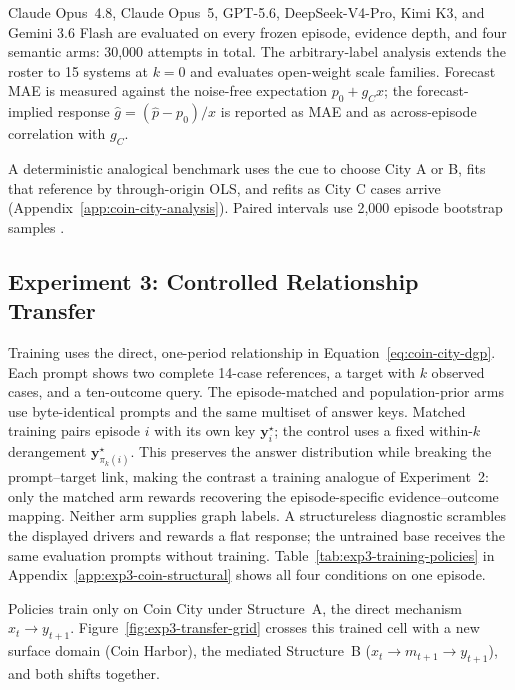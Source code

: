 Claude Opus~4.8, Claude Opus~5, GPT-5.6, DeepSeek-V4-Pro, Kimi K3, and Gemini 3.6
Flash are evaluated on every frozen episode, evidence depth, and four semantic arms:
30,000 attempts in total. The arbitrary-label analysis extends the roster to 15
systems at $k=0$ and evaluates open-weight scale families. Forecast MAE is measured against the noise-free expectation
$p_0+g_Cx$; the forecast-implied response $\hat g=(\hat p-p_0)/x$ is reported as
MAE and as across-episode correlation with $g_C$.

A deterministic analogical benchmark uses the cue to choose City A or B, fits that
reference by through-origin OLS, and refits as City C cases arrive
(Appendix~\ref{app:coin-city-analysis}). Paired intervals use 2,000 episode
bootstrap samples \citep{efron1979bootstrap}.

\subsection{Experiment 3: Controlled Relationship Transfer}
\label{sec:methods-stage3}

\label{sec:methods-exp3-synthetic}


Training uses the direct, one-period relationship in
Equation~\ref{eq:coin-city-dgp}. Each prompt shows two complete 14-case references,
a target with $k$ observed cases, and a ten-outcome query. The episode-matched and
population-prior arms use byte-identical prompts and the same multiset of answer
keys. Matched training pairs episode $i$ with its own key $\mathbf y^\star_i$;
the control uses a fixed within-$k$ derangement $\mathbf y^\star_{\pi_k(i)}$.
This preserves the answer distribution while breaking the prompt--target link,
making the contrast a training analogue of Experiment~2: only the matched arm
rewards recovering the episode-specific evidence--outcome mapping. Neither arm
supplies graph labels. A structureless diagnostic scrambles the
displayed drivers and rewards a flat response; the untrained base receives the
same evaluation prompts without training.
Table~\ref{tab:exp3-training-policies}
in Appendix~\ref{app:exp3-coin-structural} shows all four conditions on one episode.


Policies train only on Coin City under Structure~A, the direct mechanism
$x_t\to y_{t+1}$. Figure~\ref{fig:exp3-transfer-grid} crosses this trained cell
with a new surface domain (Coin Harbor), the mediated Structure~B
($x_t\to m_{t+1}\to y_{t+1}$), and both shifts together.

